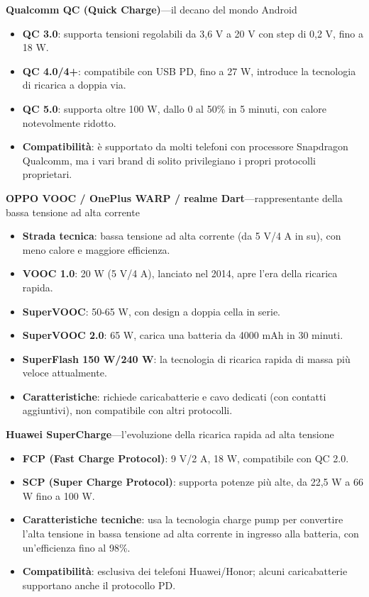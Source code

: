 \textbf{Qualcomm QC (Quick Charge)}—il decano del mondo Android

\begin{itemize}
  \item \textbf{QC 3.0}: supporta tensioni regolabili da 3,6 V a 20 V con step di 0,2 V, fino a 18 W.
  \item \textbf{QC 4.0/4+}: compatibile con USB PD, fino a 27 W, introduce la tecnologia di ricarica a doppia via.
  \item \textbf{QC 5.0}: supporta oltre 100 W, dallo 0 al 50\% in 5 minuti, con calore notevolmente ridotto.
  \item \textbf{Compatibilità}: è supportato da molti telefoni con processore Snapdragon Qualcomm, ma i vari brand di solito privilegiano i propri protocolli proprietari.
\end{itemize}

\textbf{OPPO VOOC / OnePlus WARP / realme Dart}—rappresentante della bassa tensione ad alta corrente

\begin{itemize}
  \item \textbf{Strada tecnica}: bassa tensione ad alta corrente (da 5 V/4 A in su), con meno calore e maggiore efficienza.
  \item \textbf{VOOC 1.0}: 20 W (5 V/4 A), lanciato nel 2014, apre l'era della ricarica rapida.
  \item \textbf{SuperVOOC}: 50-65 W, con design a doppia cella in serie.
  \item \textbf{SuperVOOC 2.0}: 65 W, carica una batteria da 4000 mAh in 30 minuti.
  \item \textbf{SuperFlash 150 W/240 W}: la tecnologia di ricarica rapida di massa più veloce attualmente.
  \item \textbf{Caratteristiche}: richiede caricabatterie e cavo dedicati (con contatti aggiuntivi), non compatibile con altri protocolli.
\end{itemize}

\textbf{Huawei SuperCharge}—l'evoluzione della ricarica rapida ad alta tensione

\begin{itemize}
  \item \textbf{FCP (Fast Charge Protocol)}: 9 V/2 A, 18 W, compatibile con QC 2.0.
  \item \textbf{SCP (Super Charge Protocol)}: supporta potenze più alte, da 22,5 W a 66 W fino a 100 W.
  \item \textbf{Caratteristiche tecniche}: usa la tecnologia charge pump per convertire l'alta tensione in bassa tensione ad alta corrente in ingresso alla batteria, con un'efficienza fino al 98\%.
  \item \textbf{Compatibilità}: esclusiva dei telefoni Huawei/Honor; alcuni caricabatterie supportano anche il protocollo PD.
\end{itemize}

